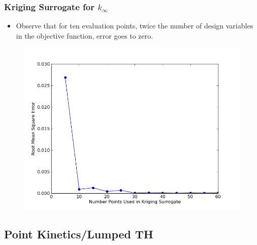\documentclass{beamer}
\begin{document}
\begin{frame}
\frametitle{Kriging Surrogate for $k_{\infty}$}

\begin{itemize}
  \item Observe that for ten evaluation points, twice the number of design variables in the objective function, error goes to zero. 
\end{itemize}

\begin{figure}
 \begin{center}
  \includegraphics[width=.75\textwidth]{./error_vs_npoints.png}
 \end{center}
\end{figure}

\end{frame}
\subsection{Point Kinetics/Lumped TH}
\end{document}
